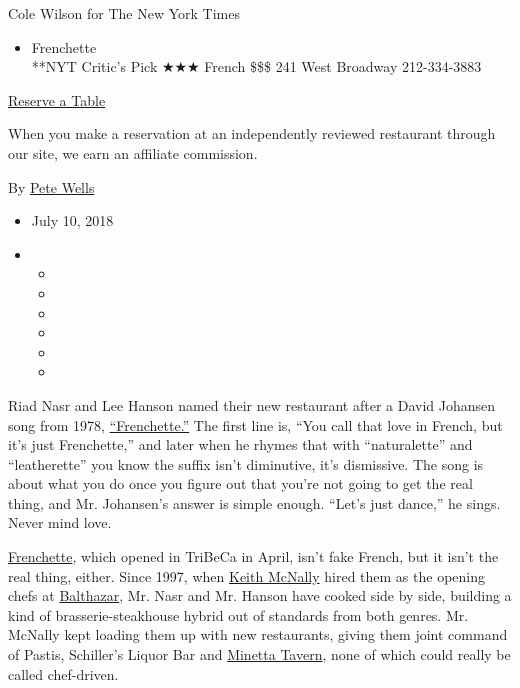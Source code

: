 Cole Wilson for The New York Times

\begin{itemize}
\tightlist
\item
  Frenchette\\
  **NYT Critic's Pick ★★★ French \$\$\$ 241 West Broadway 212-334-3883
\end{itemize}

\href{https://resy.com/cities/ny/frenchette?utm_source=nyt\&utm_medium=restoprofile\&utm_campaign=affiliates\&aff_id=c1fe784}{Reserve
a Table}

When you make a reservation at an independently reviewed restaurant
through our site, we earn an affiliate commission.

By \href{https://www.nytimes3xbfgragh.onion/by/pete-wells}{Pete Wells}

\begin{itemize}
\item
  July 10, 2018
\item
  \begin{itemize}
  \item
  \item
  \item
  \item
  \item
  \item
  \end{itemize}
\end{itemize}

Riad Nasr and Lee Hanson named their new restaurant after a David
Johansen song from 1978,
\href{https://www.youtube.com/watch?v=i7m7gAzkRrg}{``Frenchette.''} The
first line is, ``You call that love in French, but it's just
Frenchette,'' and later when he rhymes that with ``naturalette'' and
``leatherette'' you know the suffix isn't diminutive, it's dismissive.
The song is about what you do once you figure out that you're not going
to get the real thing, and Mr. Johansen's answer is simple enough.
``Let's just dance,'' he sings. Never mind love.

\href{https://www.frenchettenyc.com/}{Frenchette}, which opened in
TriBeCa in April, isn't fake French, but it isn't the real thing,
either. Since 1997, when
\href{https://www.nytimes3xbfgragh.onion/2016/11/02/dining/keith-mcnally-opening-a-restaurant-augustine.html}{Keith
McNally} hired them as the opening chefs at
\href{https://www.nytimes3xbfgragh.onion/2004/05/26/dining/restaurants-a-soho-brasserie-now-authentically-worn.html}{Balthazar},
Mr. Nasr and Mr. Hanson have cooked side by side, building a kind of
brasserie-steakhouse hybrid out of standards from both genres. Mr.
McNally kept loading them up with new restaurants, giving them joint
command of Pastis, Schiller's Liquor Bar and
\href{https://www.nytimes3xbfgragh.onion/2009/05/20/dining/reviews/20rest.html}{Minetta
Tavern}, none of which could really be called chef-driven.

